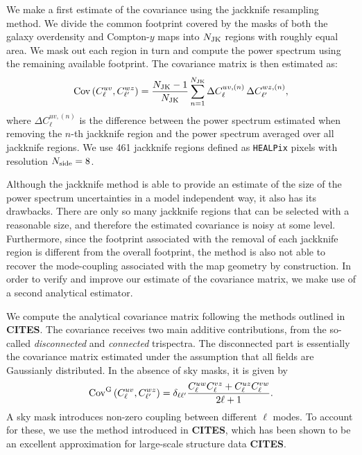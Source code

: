 \documentclass[useAMS,usenatbib]{mn2e}
\newcommand{\cites}{{\bf CITES}}
\begin{document}
    We make a first estimate of the covariance using the jackknife resampling method. We divide the common footprint covered by the masks of both the galaxy overdensity and Compton-$y$ maps into $N_{\rm JK}$ regions with roughly equal area. We mask out each region in turn and compute the power spectrum  using the remaining available footprint. The covariance matrix is then estimated as:
    \begin{equation}\label{eq:cov_jk}
      {\rm Cov}\left(C^{uv}_\ell,C^{wz}_{\ell'}\right)=\frac{N_{\rm JK}-1}{N_{\rm JK}}\sum_{n=1}^{N_{\rm JK}}\Delta C^{uv,(n)}_\ell\,\Delta C^{wz,(n)}_{\ell'},
    \end{equation}
    where $\Delta C^{uv,(n)}_\ell$ is the difference between the power spectrum estimated when removing the $n$-th jackknife region and the power spectrum averaged over all jackknife regions. We use 461 jackknife regions defined as {\tt HEALPix} pixels with resolution $N_{\rm side}=8$.

    Although the jackknife method is able to provide an estimate of the size of the power spectrum uncertainties in a model independent way, it also has its drawbacks. There are only so many jackknife regions that can be selected with a reasonable size, and therefore the estimated covariance is noisy at some level. Furthermore, since the footprint associated with the removal of each jackknife region is different from the overall footprint, the method is also not able to recover the mode-coupling associated with the map geometry by construction. In order to verify and improve our estimate of the covariance matrix, we make use of a second analytical estimator.

    We compute the analytical covariance matrix following the methods outlined in \cites. The covariance receives two main additive contributions, from the so-called {\sl disconnected} and {\sl connected} trispectra. The disconnected part is essentially the covariance matrix estimated under the assumption that all fields are Gaussianly distributed. In the absence of sky masks, it is given by
    \begin{equation}
      {\rm Cov}^{\rm G}\left(C^{uv}_\ell,C^{wz}_{\ell'}\right)=\delta_{\ell\ell'}\frac{C^{uw}_\ell C^{vz}_\ell+C^{uz}_\ell C^{vw}_\ell}{2\ell+1}.
    \end{equation}
    A sky mask introduces non-zero coupling between different $\ell$ modes. To account for these, we use the  method introduced in \cites, which has been shown to be an excellent approximation for large-scale structure data \cites.
\end{document}
